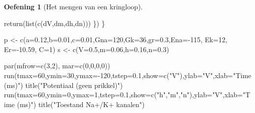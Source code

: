 \documentclass[
  a4paper,
]{scrbook}
\newenvironment{Shaded}{\begin{snugshade}}{\end{snugshade}}
\newcommand{\AttributeTok}[1]{\textcolor[rgb]{0.40,0.45,0.13}{#1}}
\newcommand{\DecValTok}[1]{\textcolor[rgb]{0.68,0.00,0.00}{#1}}
\newcommand{\FloatTok}[1]{\textcolor[rgb]{0.68,0.00,0.00}{#1}}
\newcommand{\FunctionTok}[1]{\textcolor[rgb]{0.28,0.35,0.67}{#1}}
\newcommand{\NormalTok}[1]{\textcolor[rgb]{0.00,0.23,0.31}{#1}}
\newcommand{\OtherTok}[1]{\textcolor[rgb]{0.00,0.23,0.31}{#1}}
\newcommand{\SpecialCharTok}[1]{\textcolor[rgb]{0.37,0.37,0.37}{#1}}
\newcommand{\StringTok}[1]{\textcolor[rgb]{0.13,0.47,0.30}{#1}}
\theoremstyle{definition}
\newtheorem{exercise}{Oefening}[chapter]
\theoremstyle{remark}
\begin{document}
\begin{exercise}[Het mengen van een
kringloop]
\begin{Shaded}
\begin{Highlighting}[]
    \FunctionTok{return}\NormalTok{(}\FunctionTok{list}\NormalTok{(}\FunctionTok{c}\NormalTok{(dV,dm,dh,dn)))  }
\NormalTok{  \}) }
\NormalTok{\}  }


\NormalTok{p }\OtherTok{\textless{}{-}} \FunctionTok{c}\NormalTok{(}\AttributeTok{a=}\FloatTok{0.12}\NormalTok{,}\AttributeTok{b=}\FloatTok{0.01}\NormalTok{,}\AttributeTok{c=}\FloatTok{0.01}\NormalTok{,}\AttributeTok{Gna=}\DecValTok{120}\NormalTok{,}\AttributeTok{Gk=}\DecValTok{36}\NormalTok{,}\AttributeTok{gr=}\FloatTok{0.3}\NormalTok{,}\AttributeTok{Ena=}\SpecialCharTok{{-}}\DecValTok{115}\NormalTok{, }\AttributeTok{Ek=}\DecValTok{12}\NormalTok{, }\AttributeTok{Er=}\SpecialCharTok{{-}}\FloatTok{10.59}\NormalTok{, }\AttributeTok{C=}\DecValTok{1}\NormalTok{)}
\NormalTok{s }\OtherTok{\textless{}{-}} \FunctionTok{c}\NormalTok{(}\AttributeTok{V=}\FloatTok{0.5}\NormalTok{,}\AttributeTok{m=}\FloatTok{0.06}\NormalTok{,}\AttributeTok{h=}\FloatTok{0.16}\NormalTok{,}\AttributeTok{n=}\FloatTok{0.3}\NormalTok{)}

\FunctionTok{par}\NormalTok{(}\AttributeTok{mfrow=}\FunctionTok{c}\NormalTok{(}\DecValTok{3}\NormalTok{,}\DecValTok{2}\NormalTok{), }\AttributeTok{mar=}\FunctionTok{c}\NormalTok{(}\DecValTok{0}\NormalTok{,}\DecValTok{0}\NormalTok{,}\DecValTok{0}\NormalTok{,}\DecValTok{0}\NormalTok{))}
\FunctionTok{run}\NormalTok{(}\AttributeTok{tmax=}\DecValTok{60}\NormalTok{,}\AttributeTok{ymin=}\DecValTok{30}\NormalTok{,}\AttributeTok{ymax=}\SpecialCharTok{{-}}\DecValTok{120}\NormalTok{,}\AttributeTok{tstep=}\FloatTok{0.1}\NormalTok{,}\AttributeTok{show=}\FunctionTok{c}\NormalTok{(}\StringTok{"V"}\NormalTok{),}\AttributeTok{ylab=}\StringTok{"V"}\NormalTok{,}\AttributeTok{xlab=}\StringTok{"Time (ms)"}\NormalTok{)}
\FunctionTok{title}\NormalTok{(}\StringTok{"Potentiaal (geen prikkel)"}\NormalTok{)}
\FunctionTok{run}\NormalTok{(}\AttributeTok{tmax=}\DecValTok{60}\NormalTok{,}\AttributeTok{ymin=}\DecValTok{0}\NormalTok{,}\AttributeTok{ymax=}\DecValTok{1}\NormalTok{,}\AttributeTok{tstep=}\FloatTok{0.1}\NormalTok{,}\AttributeTok{show=}\FunctionTok{c}\NormalTok{(}\StringTok{"h"}\NormalTok{,}\StringTok{"m"}\NormalTok{,}\StringTok{"n"}\NormalTok{),}\AttributeTok{ylab=}\StringTok{"V"}\NormalTok{,}\AttributeTok{xlab=}\StringTok{"Time (ms)"}\NormalTok{)}
\FunctionTok{title}\NormalTok{(}\StringTok{"Toestand Na+/K+ kanalen"}\NormalTok{)}


\end{Highlighting}
\end{Shaded}
\end{exercise}
\end{document}
